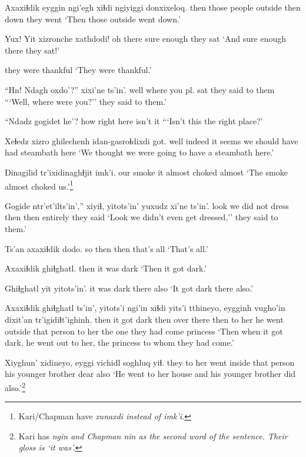 \documentclass[12pt]{article}
\begin{document}
\gll Axaxiɬdik eyggin ngi'egh xiɬdi ngiyiggi donxixeloq.
then  {those people} outside  then down  {they went}
\glt `Then those outside went down.'
\glend

\gll Yux! Yit xizronche xathdodi!
oh there {sure enough} {they sat}
\glt `And sure enough there they sat!'
\glend

{{they were thankful}}
\glt `They were thankful.'
\glend

\gll ``Hn! Ndagh oxdo'?'' xixi'ne ts'in'.
well where  {you pl. sat} {they said to them}
\glt ```Well, where were you?'' they said to them.'
\glend

\gll ``Ndadz gogidet he'?
how  {right here} {isn't it}
\glt ```Isn't this the right place?'
\glend

\gll Xeɬedz  xizro ghilechenh idan-gasroɬdixdi   got.
well indeed {it seems} {we should have had steambath} here
\glt `We thought we were going to have a steambath here.'
\glend

\gll Dinagilid tr'ixidinaghɬjit imk'i.
{our smoke} {it almost choked}  almost
\glt `The smoke almost choked us.'\footnote{Kari/Chapman have \em xunaxdi \em instead of \em imk'i.}
\glend

\gll Gogide ntr'et'ilts'in','' xiyiɬ, yitots'in' yuxudz xi'ne ts'in'.
look  {we did not dress} then then  entirely {they said} 
\glt `Look we didn't even get dressed,'' they said to them.'
\glend

\gll Ts'an axaxiɬdik dodo.
{so then} then {that's all}
\glt `That's all.'
\glend

\gll Axaxiɬdik ghiɬghatl.
then  {it was dark}
\glt `Then it got dark.'
\glend

\gll Ghiɬghatl yit yitots'in'.
{it was dark} there also
\glt `It got dark there also.'
\glend

\gll Axaxiɬdik ghiɬghatl ts'in',  yitots'i ngi'in  xiɬdi yits'i  tthineyo, eygginh vugho'in dixit'an  tr'igidiɬt'ighinh.
then  {it got dark} {} then  {over there} then {to her} {he went outside} {that person} {to her} {the one they had come} princess
\glt `Then when it got dark, he went out to her, the princess to whom they had come.'
\glend

\gll Xiyghun' xidineyo,  eyggi vichidl  soghluq yiɬ.
{they to her} {went inside} {that person} {his younger brother} dear  also
\glt `He went to her house and his younger brother did also.'\footnote{Kari has \em ngin \em and Chapman \em nin \em as the second word of the sentence. Their gloss is `it was'.}
\glend
\end{document}
